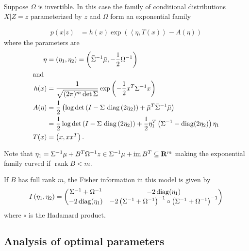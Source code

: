 \begin{proposition}
    \label{prop:exponential_family_posterior}
    Suppose $\Omega$ is invertible.
    In this case the family of conditional distributions $X|Z=z$ parameterized by $z$ and $\Omega$ form an exponential family

    \begin{align*}
        p(x|z) & = h(x) \exp \left( \left\langle \eta, T(x) \right\rangle - A(\eta)\right)
    \end{align*}
    where the parameters are 
    \begin{align*}
      \eta &= \left( \eta_{1}, \eta_{2} \right) = \left( \bar\Sigma^{-1} \bar\mu, -\frac{1}{2} \Omega^{-1}\right) \\
      \intertext{and }
      h(x) &= \frac{1}{\sqrt{(2\pi)^{m} \det \Sigma}}\exp \left( - \frac{1}{2} x^{T} \Sigma^{-1}x \right) \\
      A(\eta) &= \frac{1}{2} \left( \log \det \left( I - \Sigma \,\operatorname{diag} \left( 2 \eta_{2} \right)  \right)  + \bar\mu^{T}\bar\Sigma^{-1}\bar\mu \right) \\
      &= \frac{1}{2} \log \det \left(I - \Sigma \, \operatorname{diag}\left(2\eta_{2}\right)\right) + \frac{1}{2} \eta_{1}^{T} \left( \Sigma^{-1} - \operatorname{diag} (2\eta_{2}) \right)  \eta_{1}\\
      T(x) &= \left( x, x x ^T \right).
    \end{align*}

    Note that $\eta_{1} = \Sigma ^{-1} \mu + B^{T}\Omega^{-1}z \in \Sigma^{-1}\mu + \operatorname{im} B^{T} \subseteq \mathbf R^{m}$ making the exponential family curved if $\operatorname{rank} B < m$.

    If $B$ has full rank $m$, the Fisher information in this model is given by
    $$
    I \left( \eta_{1}, \eta_{2} \right) = \begin{pmatrix}
        \Sigma^{-1} + \Omega^{-1} & - 2 \operatorname{diag}(\eta_{1}) \\
        -2 \operatorname{diag}(\eta_{1}) & -2 \left( \Sigma^{-1} + \Omega^{-1} \right)^{-1} \circ \left( \Sigma^{-1} + \Omega^{-1} \right)^{-1}
    \end{pmatrix}
    $$
    where $\circ$ is the Hadamard product.
\end{proposition}

\subsection{Analysis of optimal parameters}
\label{subsec:analysis_of_optimal_parameters}



